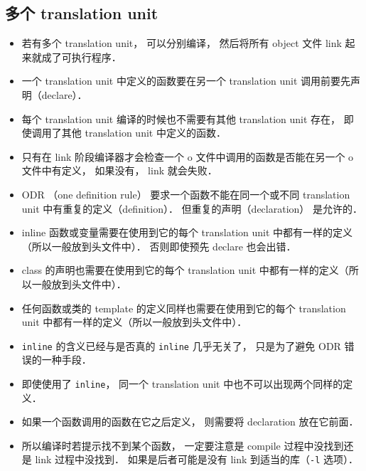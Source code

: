 \subsection{多个  translation unit}
\begin{itemize}
\item 若有多个 translation unit， 可以分别编译， 然后将所有 object 文件 link 起来就成了可执行程序．
\item 一个 translation unit 中定义的函数要在另一个 translation unit 调用前要先声明（declare）．
\item 每个 translation unit 编译的时候也不需要有其他 translation unit 存在， 即使调用了其他 translation unit 中定义的函数．
\item 只有在 link 阶段编译器才会检查一个 o 文件中调用的函数是否能在另一个 o 文件中有定义， 如果没有， link 就会失败．
\item ODR （one definition rule） 要求一个函数不能在同一个或不同 translation unit 中有重复的定义（definition）． 但重复的声明（declaration） 是允许的．
\item inline 函数或变量需要在使用到它的每个 translation unit 中都有一样的定义（所以一般放到头文件中）． 否则即使预先 declare 也会出错．
\item class 的声明也需要在使用到它的每个 translation unit 中都有一样的定义（所以一般放到头文件中）．
\item 任何函数或类的 template 的定义同样也需要在使用到它的每个 translation unit 中都有一样的定义（所以一般放到头文件中）．
\item \verb|inline| 的含义已经与是否真的 \verb|inline| 几乎无关了， 只是为了避免 ODR 错误的一种手段．
\item 即使使用了 \verb|inline|， 同一个 translation unit 中也不可以出现两个同样的定义．
\item 如果一个函数调用的函数在它之后定义， 则需要将 declaration 放在它前面．
\item 所以编译时若提示找不到某个函数， 一定要注意是 compile 过程中没找到还是 link 过程中没找到． 如果是后者可能是没有 link 到适当的库（\verb|-l| 选项）．
\end{itemize}
